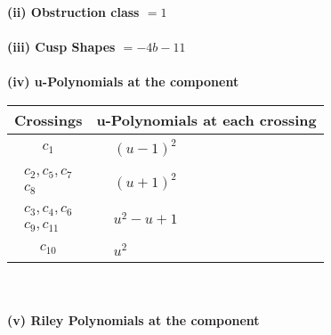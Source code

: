 \documentclass[1p]{elsarticle_modified}
\theoremstyle{definition}
\begin{document}
\flushleft \textbf{(ii) Obstruction class $= 1$}\\~\\
\flushleft \textbf{(iii) Cusp Shapes $= -4 b-11$}\\~\\
\newpage\renewcommand{\arraystretch}{1}
\flushleft \textbf{(iv) u-Polynomials at the component}\newline \\
\begin{tabular}{m{50pt}|m{274pt}}
Crossings & \hspace{64pt}u-Polynomials at each crossing \\
\hline $$\begin{aligned}c_{1}\end{aligned}$$&$\begin{aligned}
&(u-1)^2
\end{aligned}$\\
\hline $$\begin{aligned}c_{2},c_{5},c_{7}\\c_{8}\end{aligned}$$&$\begin{aligned}
&(u+1)^2
\end{aligned}$\\
\hline $$\begin{aligned}c_{3},c_{4},c_{6}\\c_{9},c_{11}\end{aligned}$$&$\begin{aligned}
&u^2- u+1
\end{aligned}$\\
\hline $$\begin{aligned}c_{10}\end{aligned}$$&$\begin{aligned}
&u^2
\end{aligned}$\\
\hline
\end{tabular}\\~\\
\newpage\renewcommand{\arraystretch}{1}
\flushleft \textbf{(v) Riley Polynomials at the component}\newline \\
\end{document}
